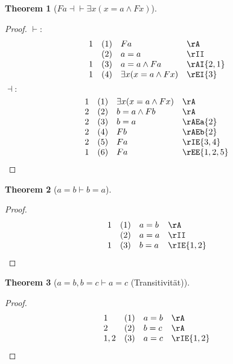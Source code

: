 \documentclass{book}
\theoremstyle{plain}
\newtheorem{theorem}{Theorem}
\theoremstyle{remark}
\theoremstyle{definition}
\begin{document}
\label{FaEqvExxLpxIdaAndFxRp}
\begin{theorem}[\(Fa\dashv\vdash \exists x(x=a\land Fx)\)]
\end{theorem}
\begin{proof}
	\(\vdash:\)
	\[
	\begin{array}{llll}
		1 & (1) & Fa & \rA \\
		& (2) & a=a & \rII\\
		1 & (3) & a=a\land Fa & \rAI{2,1} \\	
		1 & (4) & \exists x(x=a\land Fx) & \rEI{3} \\	
	\end{array}
	\]
	\(\dashv:\)
	\[
	\begin{array}{llll}
		1 & (1) & \exists x(x=a\land Fx) & \rA \\
		2 & (2) & b=a\land Fb & \rA \\		
		2 & (3) & b=a & \rAEa{2} \\	
		2 & (4) & Fb & \rAEb{2} \\	
		2 & (5) & Fa & \rIE{3,4} \\	
		1 & (6) & Fa & \rEE{1,2,5} \\	
	\end{array}
	\]
\end{proof}

\label{aIdbImpbIda}
\begin{theorem}[\(a=b\vdash b=a\)]
\end{theorem}
\begin{proof}
	\[
	\begin{array}{llll}
		1 & (1) & a=b & \rA \\
		& (2) & a=a & \rII \\
		1 & (3) & b=a & \rIE{1,2} \\
	\end{array}
	\]
\end{proof}

\label{aIdbwbIdcImpaIdc}
\begin{theorem}[\(a=b,b=c\vdash a=c\) (Transitivität)]
\end{theorem}
\begin{proof}
	\[
	\begin{array}{llll}
		1 & (1) & a=b & \rA \\
		2 & (2) & b=c & \rA \\
		1,2 & (3) & a=c & \rIE{1,2} \\
	\end{array}
	\]
\end{proof}
\end{document}
